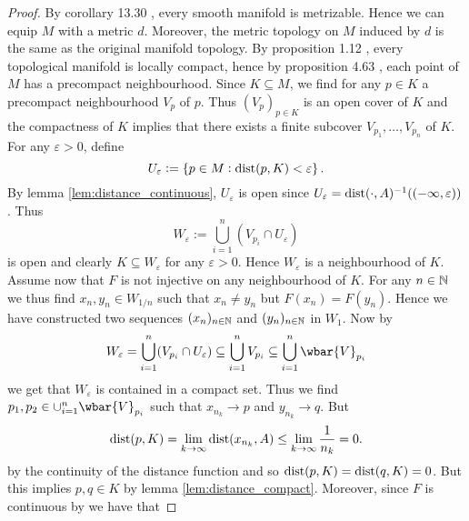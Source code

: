 \begin{proof}
	By corollary 13.30 \cite[341]{lee:smooth_manifolds:2013}, every smooth manifold is metrizable. Hence we can equip $M$ with a metric $d$. Moreover, the metric topology on $M$ induced by $d$ is the same as the original manifold topology. By proposition 1.12 \cite[9]{lee:smooth_manifolds:2013}, every topological manifold is locally compact, hence by proposition 4.63 \cite[104--105]{lee:topological_manifolds:2011}, each point of $M$ has a precompact neighbourhood. Since $K \subseteq M$, we find for any $p \in K$ a precompact neighbourhood $V_p$ of $p$. Thus $(V_p)_{p \in K}$ is an open cover of $K$ and the compactness of $K$ implies that there exists a finite subcover $V_{p_1},\dots,V_{p_n}$ of $K$.\\
	For any $\varepsilon > 0$, define
	\begin{equation*}
		U_\varepsilon := \cbr[0]{ p \in M : \dist(p,K) < \varepsilon}.
	\end{equation*}
	By lemma \ref{lem:distance_continuous}, $U_\varepsilon$ is open since $U_\varepsilon = \dist(\cdot,A)^{-1}(\intoo{-\infty,\varepsilon})$. Thus 
	\begin{equation*}
		W_\varepsilon := \bigcup_{i = 1}^n (V_{p_i} \cap U_\varepsilon)
	\end{equation*}
	\noindent is open and clearly $K \subseteq W_\varepsilon$ for any $\varepsilon > 0$. Hence $W_\varepsilon$ is a neighbourhood of $K$.\\
	Assume now that $F$ is not injective on any neighbourhood of $K$. For any $n \in \mathbb{N}$ we thus find $x_n,y_n \in W_{1/n}$ such that $x_n \neq y_n$ but $F(x_n) = F(y_n)$. Hence we have constructed two sequences $(x_n)_{n \in \mathbb{N}}$ and $(y_n)_{n \in \mathbb{N}}$ in $W_1$. Now by 
	\begin{equation*}
		W_\varepsilon = \bigcup_{i = 1}^n (V_{p_i} \cap U_\varepsilon) \subseteq \bigcup_{i = 1}^n V_{p_i} \subseteq \bigcup_{i = 1}^n \wbar{V}_{p_i} 
	\end{equation*}
	\noindent we get that $W_\varepsilon$ is contained in a compact set. Thus we find $p_1,p_2 \in \cup_{i = 1}^n \wbar{V}_{p_i}$ such that $x_{n_k} \to p$ and $y_{n_k} \to q$. But 
	\begin{equation*}
		\operatorname{dist}(p,K) = \lim_{k \to \infty}\operatorname{dist}(x_{n_k},A) \leq \lim_{k \to \infty}\frac{1}{n_k} = 0.
	\end{equation*}
	\noindent by the continuity of the distance function and so $\operatorname{dist}(p,K) = \operatorname{dist}(q,K) = 0$. But this implies $p,q \in K$ by lemma \ref{lem:distance_compact}. Moreover, since $F$ is continuous by \cite[34]{lee:smooth_manifolds:2013} we have that

\end{proof}
